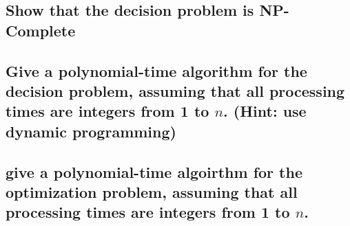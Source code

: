 \documentclass[titlepage]{article}\usepackage[]{graphicx}\usepackage[]{color}
\begin{document}
\subsection{Show that the decision problem is NP-Complete}
\vspace{4cm}

\subsection{Give a polynomial-time algorithm for the decision problem, assuming
  that all processing times are integers from 1 to $n$. (Hint: use dynamic
programming)}
\vspace{4cm}


\subsection{give a polynomial-time algoirthm for the optimization problem,
assuming that all processing times are integers from 1 to $n$.}
\end{document}
